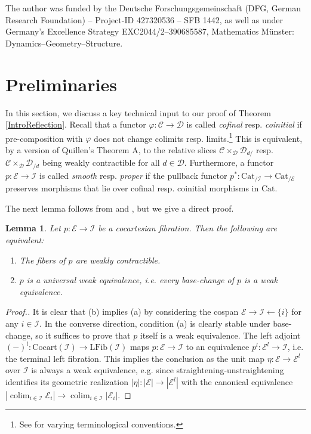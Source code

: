 \documentclass[a4paper,reqno,10pt]{amsart}
\newtheorem{lemma}[theorem]{Lemma}
\theoremstyle{definition}
\theoremstyle{remark}
\newcommand{\C}{\mathcal{C}}
\newcommand{\D}{\mathcal{D}}
\newcommand{\E}{\mathcal{E}}
\newcommand{\I}{\mathcal{I}}
\newcommand{\Cocart}{\mathrm{Cocart}}
\newcommand{\LFib}{\mathrm{LFib}}
\DeclareMathOperator*{\colim}{colim}
\newcommand{\Cat}{\mathrm{Cat}}
\newcommand{\pb}{\arrow[dr,phantom,very near start,"\lrcorner"]}
\begin{document}
The author was funded by the Deutsche Forschungsgemeinschaft (DFG, German Research Foundation) – Project-ID 427320536 – SFB 1442, as well as under Germany’s Excellence Strategy EXC2044/2–390685587, Mathematics Münster: Dynamics–Geometry–Structure.

\section{Preliminaries}

In this section, we discuss a key technical input to our proof of Theorem \ref{IntroReflection}. Recall that a functor $\varphi\colon\C\rightarrow\D$ is called \textit{cofinal} resp. \textit{coinitial} if pre-composition with $\varphi$ does not change colimits resp. limits.\footnote{See \cite[Table 6.1]{HaugsengYetAnother} for varying terminological conventions.} This is equivalent, by a version of Quillen's Theorem A, to the relative slices $\C\times_{\D}\D_{d/}$ resp. $\C\times_{\D}\D_{/d}$ being weakly contractible for all $d\in\D$. Furthermore, a functor $p\colon\E\rightarrow\I$ is called \textit{smooth} resp. \textit{proper} if the pullback functor $p^{\ast}\colon\Cat_{/\I}\rightarrow\Cat_{/\E}$ preserves morphisms that lie over cofinal resp. coinitial morphisms in $\Cat$.

The next lemma follows from \cite[Lemma 5.5]{HHNLSpans} and \cite[Corollary 7.7.10]{HaugsengYetAnother}, but we give a direct proof.

\begin{lemma}\label{RealizationFibWeakEquivaence}
Let $p\colon\E\rightarrow\I$ be a cocartesian fibration. Then the following are equivalent:
\begin{enumerate}[label=(\alph*)]
\item The fibers of $p$ are weakly contractible.
\item $p$ is a universal weak equivalence, i.e. every base-change of $p$ is a weak equivalence.
\end{enumerate}
\end{lemma}
\begin{proof}[Proof.]
It is clear that (b) implies (a) by considering the cospan $\E\rightarrow\I\leftarrow\{i\}$ for any $i\in\I$. In the converse direction, condition (a) is clearly stable under base-change, so it suffices to prove that $p$ itself is a weak equivalence. The left adjoint $(-)^l\colon\Cocart(\I)\rightarrow\LFib(\I)$ maps $p\colon\E\rightarrow\I$ to an equivalence $p^l\colon\E^l\rightarrow\I$, i.e. the terminal left fibration. This implies the conclusion as the unit map $\eta\colon\E\rightarrow\E^l$ over $\I$ is always a weak equivalence, e.g. since straightening-unstraightening identifies its geometric realization $|\eta|\colon|\E|\rightarrow|\E^l|$ with the canonical equivalence $|\colim_{i\in\I}\E_i|\rightarrow\colim_{i\in\I}|\E_i|$.
\end{proof}
\end{document}
